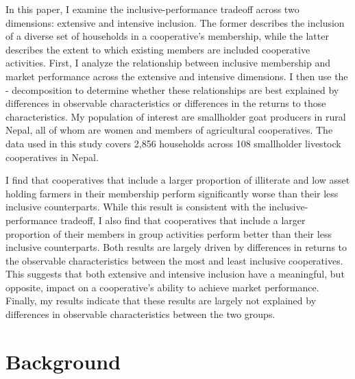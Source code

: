 \documentclass[11pt]{article}
\begin{document}
In this paper, I examine the inclusive-performance tradeoff across two dimensions: extensive and intensive inclusion. The former describes the inclusion of a diverse set of households in a cooperative's membership, while the latter describes the extent to which existing members are included cooperative activities. First, I analyze the relationship between inclusive membership and market performance across the extensive and intensive dimensions. I then use the \citet{oaxaca_male-female_1973}-\citet{blinder_wage_1973} decomposition to determine whether these relationships are best explained by differences in observable characteristics or differences in the returns to those characteristics. My population of interest are smallholder goat producers in rural Nepal, all of whom are women and members of agricultural cooperatives. The data used in this study covers 2,856 households across 108 smallholder livestock cooperatives in Nepal. 

I find that cooperatives that include a larger proportion of illiterate and low asset holding farmers in their membership perform significantly worse than their less inclusive counterparts. While this result is consistent with the inclusive-performance tradeoff, I also find that cooperatives that include a larger proportion of their members in group activities perform better than their less inclusive counterparts. Both results are largely driven by differences in returns to the observable characteristics between the most and least inclusive cooperatives. This suggests that both extensive and intensive inclusion have a meaningful, but opposite, impact on a cooperative's ability to achieve market performance. Finally, my results indicate that these results are largely not explained by differences in observable characteristics between the two groups. %


\section{Background} \label{sec:background}
\end{document}
